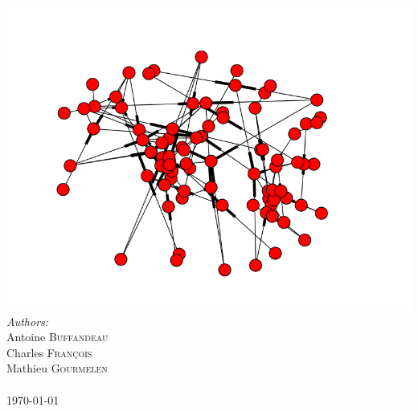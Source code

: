 \documentclass[12pt]{article}
\begin{document}
\begin{titlepage}
\includegraphics[scale=0.5]{network_stock_page_de_garde.png}\\
\Large \emph{Authors:}\\
Antoine \textsc{Buffandeau}\\
Charles \textsc{François}\\
Mathieu \textsc{Gourmelen}\\
 \textsc{}
\\[1cm]
{\large \today} %
\vfill
\end{titlepage}
\hypertarget{sec:part1}{}
\end{document}
